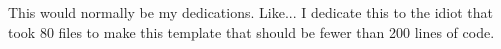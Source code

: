 This would normally be my dedications. Like... I dedicate this to the idiot that took 80 files to make this template that should be fewer than 200 lines of code.